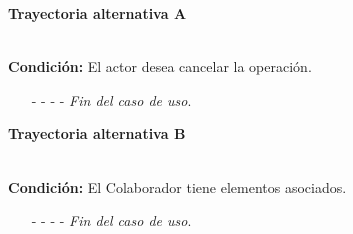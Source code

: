 \hypertarget{CU3-3:TAA}{\textbf{Trayectoria alternativa A}}\\
\noindent \textbf{Condición:} El actor desea cancelar la operación.
\begin{enumerate}
	\UCpaso[\UCactor] Solicita cancelar la operación oprimiendo el botón  de la ventana emergente.
	\UCpaso[\UCsist] Muestra la pantalla .
	\item[- -] - - {\em {Fin del caso de uso}}.%
\end{enumerate}		
	\hypertarget{CU3-3:TAB}{\textbf{Trayectoria alternativa B}}\\
	\noindent \textbf{Condición:} El Colaborador tiene elementos asociados.
	\begin{enumerate}
		\UCpaso[\UCsist] Muestra el mensaje  en la pantalla .
		\item[- -] - - {\em {Fin del caso de uso}}.%
	\end{enumerate}

